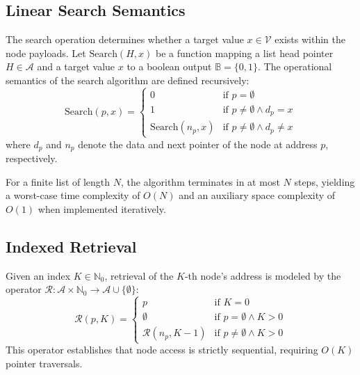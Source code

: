 \documentclass[10pt,journal,compsoc]{IEEEtran}
\begin{document}
\subsection{Linear Search Semantics}
The search operation determines whether a target value $x \in \mathcal{V}$ exists within the node payloads. Let $\text{Search}(H, x)$ be a function mapping a list head pointer $H \in \mathcal{A}$ and a target value $x$ to a boolean output $\mathbb{B} = \{0, 1\}$. The operational semantics of the search algorithm are defined recursively:
\[ \text{Search}(p, x) = \begin{cases}
0 & \text{if } p = \emptyset \\
1 & \text{if } p \neq \emptyset \land d_p = x \\
\text{Search}(n_p, x) & \text{if } p \neq \emptyset \land d_p \neq x
\end{cases} \]
where $d_p$ and $n_p$ denote the data and next pointer of the node at address $p$, respectively.

For a finite list of length $N$, the algorithm terminates in at most $N$ steps, yielding a worst-case time complexity of $O(N)$ and an auxiliary space complexity of $O(1)$ when implemented iteratively.

\subsection{Indexed Retrieval}
Given an index $K \in \mathbb{N}_0$, retrieval of the $K$-th node's address is modeled by the operator $\mathcal{R}: \mathcal{A} \times \mathbb{N}_0 \to \mathcal{A} \cup \{\emptyset\}$:
\[ \mathcal{R}(p, K) = \begin{cases}
p & \text{if } K = 0 \\
\emptyset & \text{if } p = \emptyset \land K > 0 \\
\mathcal{R}(n_p, K-1) & \text{if } p \neq \emptyset \land K > 0
\end{cases} \]
This operator establishes that node access is strictly sequential, requiring $O(K)$ pointer traversals.
\end{document}
